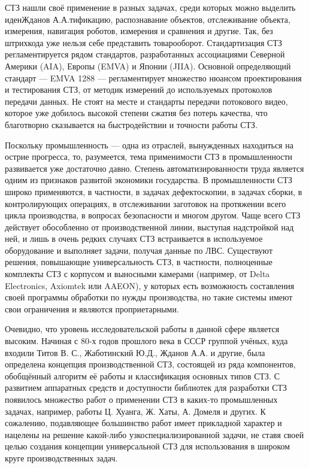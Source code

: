 СТЗ нашли своё применение в разных задачах, среди которых можно выделить иденЖданов А.А.тификацию, распознавание объектов, отслеживание объекта, измерения, навигация роботов, измерения и сравнения и другие. Так, без штрихкода уже нельзя себе представить товарооборот. Стандартизация СТЗ регламентируется рядом стандартов, разработанных ассоциациями Северной Америки (AIA), Европы (EMVA) и Японии (JIIA). Основной определяющий стандарт --- EMVA 1288 --- регламентирует множество нюансом проектирования и тестирования СТЗ, от методик измерений до используемых протоколов передачи данных. Не стоят на месте и стандарты передачи потокового видео, которое уже добилось высокой степени сжатия без потерь качества, что благотворно сказывается на быстродействии и точности работы СТЗ.

Поскольку промышленность --- одна из отраслей, вынужденных находиться на острие прогресса, то, разумеется, тема применимости СТЗ в промышленности развивается уже достаточно давно. Степень автоматизированности труда является одним из признаков развитой экономики государства. В промышленности СТЗ широко применяются, в частности, в задачах дефектоскопии, в задачах сборки, в контролирующих операциях, в отслеживании заготовок на протяжении всего цикла производства, в вопросах безопасности и многом другом. Чаще всего СТЗ действует обособленно от производственной линии, выступая надстройкой над ней, и лишь в очень редких случаях СТЗ встраивается в используемое оборудование и выполняет задачи, получая данные по ЛВС. Существуют решения, повышающие универсальность СТЗ, в частности, полноценные комплекты СТЗ с корпусом и выносными камерами (например, от Delta Electronics, Axiomtek или AAEON), у которых есть возможность составления своей программы обработки по нужды производства, но такие системы имеют свои ограничения и являются проприетарными.

Очевидно, что уровень исследовательской работы в данной сфере является высоким. Начиная с 80-х годов прошлого века в СССР группой учёных, куда входили Титов В. С., Жаботинский Ю.Д., Жданов А.А. и другие, была определена концепция производственной СТЗ, состоящей из ряда компонентов, обобщённый алгоритм её работы и классификация основных типов СТЗ. С развитием аппаратных средств и доступности библиотек для разработки СТЗ появилось множество работ о применении СТЗ в каких-то промышленных задачах, например, работы Ц. Хуанга, Ж. Хаты, А. Домеля и других. К сожалению, подавляющее большинство работ имеет прикладной характер и нацелены на решение какой-либо узкоспециализированной задачи, не ставя своей целью создания концепции универсальной СТЗ для использования в широком круге производственных задач.

